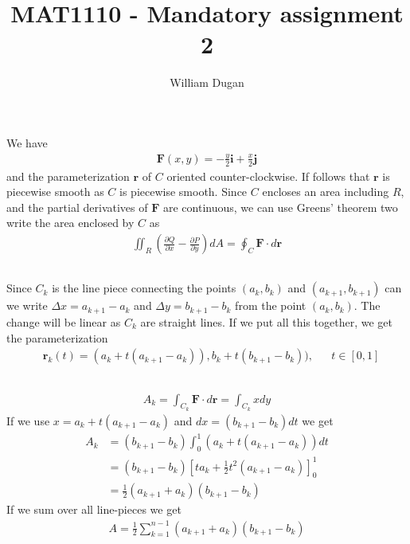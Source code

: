 \documentclass[a4paper,10pt,english]{article}
\title{MAT1110 - Mandatory assignment 2}
\author{William Dugan}
\begin{document}
\maketitle

\section{} \label{1}

\subsection{} \label{1a}

We have
\begin{align}
    \bm{F} (x, y) = - \frac{y}{2} \bm{i} + \frac{x}{2} \bm{j}
\end{align}
and the parameterization $\bm{r}$ of $C$ oriented counter-clockwise. If follows that $\bm{r}$ is piecewise smooth as $C$ is piecewise smooth. Since $C$ encloses an area including $R$, and the partial derivatives of $\bm{F}$ are continuous, we can use Greens' theorem two write the area enclosed by $C$ as
\begin{align*}
    \iint_R \left( \frac{\partial Q}{\partial x} - \frac{\partial P}{\partial y} \right) dA 
    = \oint_C \bm{F} \cdot d\bm{r}
\end{align*}

\subsection{} \label{1b}
Since $C_k$ is the line piece connecting the points $(a_k, b_k)$ and $(a_{k+1}, b_{k+1})$ can we write \newline $\Delta x = a_{k+1} - a_k$ and $\Delta y = b_{k+1} - b_k$ from the point $(a_k, b_k)$. The change will be linear as $C_k$ are straight lines. If we put all this together, we get the parameterization
\begin{align}
    &\bm{r}_k (t) = 
    (a_k + t (a_{k+1} - a_k)), b_k + t (b_{k+1} - b_k)), 
    & &t \in [0, 1]
\end{align}

\subsection{} \label{1c}
\begin{align*}
    A_k = \int_{C_k} \bm{F} \cdot d\bm{r} = \int_{C_k} x dy
\end{align*}
If we use $x = a_k + t (a_{k+1} - a_k)$ and $dx = ( b_{k+1} - b_k) dt$ we get
\begin{align*}
    A_k &= (b_{k+1} - b_k) \int_0^1 (a_k + t (a_{k+1} - a_k)) dt \\
    &= (b_{k+1} - b_k) \left[ ta_k + \frac{1}{2} t^2 (a_{k+1} - a_k) \right]_0^1 \\
    &= \frac{1}{2} (a_{k+1} + a_k)(b_{k+1} - b_k)
\end{align*}
If we sum over all line-pieces we get
\begin{align} \label{eq:sum}
    A = \frac{1}{2} \sum_{k=1}^{n-1} (a_{k+1} + a_k)(b_{k+1} - b_k)
\end{align}
\end{document}
